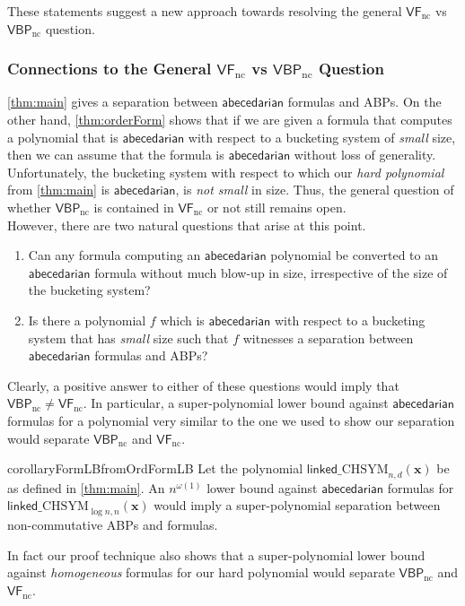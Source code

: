 \documentclass[10pt,a4paper]{article}
\def\vecx{\mathbf{x}}
\def\ncVF{\mathsf{VF}_{\text{nc}}}
\def\ncVBP{\mathsf{VBP}_{\text{nc}}}
\newcommand{\abcd}{\mathsf{abecedarian}}
\newcommand{\lchsym}[2]{\mathrm{\mathsf{linked}\_CHSYM}_{#1,#2}}
\begin{document}
\noindent These statements suggest a new approach towards resolving the general $\ncVF$ vs $\ncVBP$ question.

\subsubsection*{Connections to the General $\ncVF$ vs $\ncVBP$ Question}

\autoref{thm:main} gives a separation between $\abcd$ formulas and ABPs.
On the other hand, \autoref{thm:orderForm} shows that if we are given a formula that computes a polynomial that is $\abcd$ with respect to a bucketing system of \emph{small} size, then we can assume that the formula is $\abcd$ without loss of generality.
Unfortunately, the bucketing system with respect to which our \emph{hard polynomial} from \autoref{thm:main} is $\abcd$, is \emph{not small} in size.
Thus, the general question of whether $\ncVBP$ is contained in $\ncVF$ or not still remains open.\\ 

\noindent However, there are two natural questions that arise at this point.
\begin{enumerate}
	\item Can any formula computing an $\abcd$ polynomial be converted to an $\abcd$ formula without much blow-up in size, irrespective of the size of the bucketing system? 
	\item Is there a polynomial $f$ which is $\abcd$ with respect to a bucketing system that has \emph{small} size such that $f$ witnesses a separation between $\abcd$ formulas and ABPs?
\end{enumerate}

\noindent Clearly, a positive answer to either of these questions would imply that $\ncVBP \neq \ncVF$.
In particular, a super-polynomial lower bound against $\abcd$ formulas for a polynomial very similar to the one we used to show our separation would separate $\ncVBP$ and $\ncVF$.

\begin{restatable}{corollary}{FormLBfromOrdFormLB}\label{cor:FormLBfromOrdFormLB}
	Let the polynomial $\lchsym{n}{d}(\vecx)$ be as defined in \autoref{thm:main}.
	An $n^{\omega(1)}$ lower bound against $\abcd$ formulas for $\lchsym{\log n}{n}(\vecx)$ would imply a super-polynomial separation between non-commutative ABPs and formulas.
\end{restatable}

In fact our proof technique also shows that a super-polynomial lower bound against \emph{homogeneous} formulas for our hard polynomial would separate $\ncVBP$ and $\ncVF$.
\end{document}
